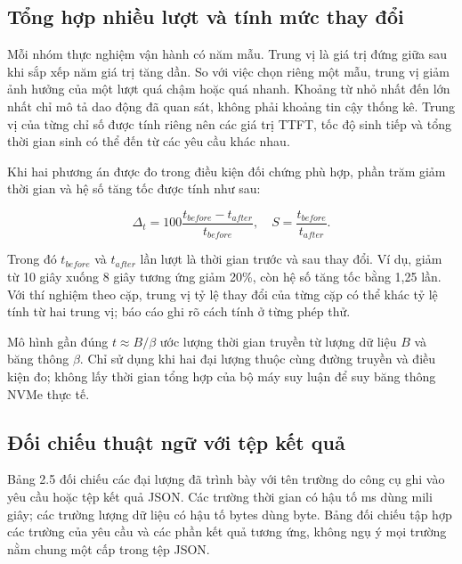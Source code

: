 \subsection{Tổng hợp nhiều lượt và tính mức thay đổi}

Mỗi nhóm thực nghiệm vận hành có năm mẫu. Trung vị là giá trị đứng giữa sau khi sắp xếp năm giá trị tăng dần. So với việc chọn riêng một mẫu, trung vị giảm ảnh hưởng của một lượt quá chậm hoặc quá nhanh. Khoảng từ nhỏ nhất đến lớn nhất chỉ mô tả dao động đã quan sát, không phải khoảng tin cậy thống kê. Trung vị của từng chỉ số được tính riêng nên các giá trị TTFT, tốc độ sinh tiếp và tổng thời gian sinh có thể đến từ các yêu cầu khác nhau.

Khi hai phương án được đo trong điều kiện đối chứng phù hợp, phần trăm giảm thời gian và hệ số tăng tốc được tính như sau:

\begin{equation}
\label{eq:2.13}
\Delta_t=100\frac{t_{before}-t_{after}}{t_{before}},\quad S=\frac{t_{before}}{t_{after}}.
\end{equation}

Trong đó $t_{before}$ và $t_{after}$ lần lượt là thời gian trước và sau thay đổi. Ví dụ, giảm từ 10 giây xuống 8 giây tương ứng giảm 20\%, còn hệ số tăng tốc bằng 1,25 lần. Với thí nghiệm theo cặp, trung vị tỷ lệ thay đổi của từng cặp có thể khác tỷ lệ tính từ hai trung vị; báo cáo ghi rõ cách tính ở từng phép thử.

Mô hình gần đúng $t\approx B/\beta$ ước lượng thời gian truyền từ lượng dữ liệu $B$ và băng thông $\beta$. Chỉ sử dụng khi hai đại lượng thuộc cùng đường truyền và điều kiện đo; không lấy thời gian tổng hợp của bộ máy suy luận để suy băng thông NVMe thực tế.

\subsection{Đối chiếu thuật ngữ với tệp kết quả}

Bảng 2.5 đối chiếu các đại lượng đã trình bày với tên trường do công cụ ghi vào yêu cầu hoặc tệp kết quả JSON. Các trường thời gian có hậu tố ms dùng mili giây; các trường lượng dữ liệu có hậu tố bytes dùng byte. Bảng đối chiếu tập hợp các trường của yêu cầu và các phần kết quả tương ứng, không ngụ ý mọi trường nằm chung một cấp trong tệp JSON.

